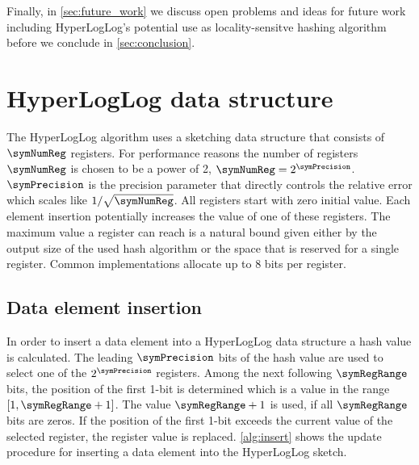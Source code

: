 \documentclass[a4paper]{scrartcl}
\begin{document}
Finally, in \cref{sec:future_work} we discuss open problems and ideas for future work including HyperLogLog's potential use as locality-sensitve hashing algorithm before we conclude in \cref{sec:conclusion}.

\section{HyperLogLog data structure}
\label{sec:hyperloglog_data_structure}
The HyperLogLog algorithm uses a sketching data structure that consists of $\symNumReg$ registers. For performance reasons the number of registers $\symNumReg$ is chosen to be a power of 2, $\symNumReg = 2^\symPrecision$. $\symPrecision$ is the precision parameter that directly controls the relative error which scales like $1/\sqrt{\symNumReg}$. All registers start with zero initial value. Each element insertion potentially increases the value of one of these registers. The maximum value a register can reach is a natural bound given either by the output size of the used hash algorithm or the space that is reserved for a single register. Common implementations allocate up to 8 bits per register.

\subsection{Data element insertion}
\label{sec:data_element_insertion}
In order to insert a data element into a HyperLogLog data structure a hash value is calculated. The leading $\symPrecision$ bits of the hash value are used to select one of the $2^\symPrecision$ registers. Among the next following $\symRegRange$ bits, the position of the first 1-bit is determined which is a value in the range $[1,\symRegRange+1]$. The value $\symRegRange+1$ is used, if all $\symRegRange$ bits are zeros. If the position of the first 1-bit exceeds the current value of the selected register, the register value is replaced. \cref{alg:insert} shows the update procedure for inserting a data element into the HyperLogLog sketch.
\end{document}
